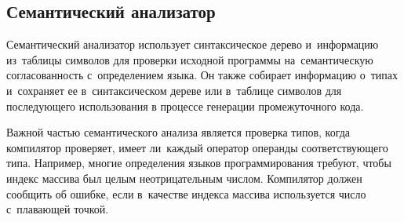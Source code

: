 \subsection{Семантический анализатор} \label{sub115}

Семантический анализатор использует синтаксическое дерево и~информацию из~таблицы символов для проверки исходной программы на~семантическую согласованность с~определением языка. Он также собирает информацию о~типах и~сохраняет ее в~синтаксическом дереве или в~таблице символов для последующего использования в процессе генерации промежуточного кода.

Важной частью семантического анализа является проверка типов, когда компилятор проверяет, имеет ли~каждый оператор операнды соответствующего типа. Например, многие определения языков программирования требуют, чтобы индекс массива был целым неотрицательным числом. Компилятор должен сообщить об ошибке, если в~качестве индекса массива используется число с~плавающей точкой.